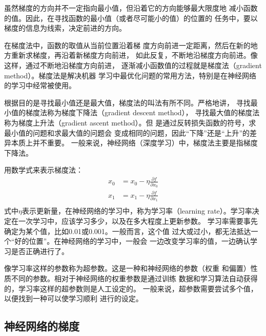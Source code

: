 虽然梯度的方向并不一定指向最小值，但沿着它的方向能够最大限度地
减小函数的值。因此，在寻找函数的最小值（或者尽可能小的值）的位置的
任务中，要以梯度的信息为线索，决定前进的方向。

在梯度法中，函数的取值从当前位置沿着梯
度方向前进一定距离，然后在新的地方重新求梯度，再沿着新梯度方向前进，
如此反复，不断地沿梯度方向前进。像这样，通过不断地沿梯度方向前进，
逐渐减小函数值的过程就是梯度法（gradient method）。梯度法是解决机器
学习中最优化问题的常用方法，特别是在神经网络的学习中经常被使用。

\begin{tcolorbox}
    根据目的是寻找最小值还是最大值，梯度法的叫法有所不同。严格地讲，
    寻找最小值的梯度法称为梯度下降法（gradient descent method），
    寻找最大值的梯度法称为梯度上升法（gradient ascent method）。但
    是通过反转损失函数的符号，求最小值的问题和求最大值的问题会
    变成相同的问题，因此“下降”还是“上升”的差异本质上并不重要。
    一般来说，神经网络（深度学习）中，梯度法主要是指梯度下降法。
\end{tcolorbox}

用数学式来表示梯度法：
\begin{equation}
    \begin{aligned}
        x_0 & =x_0-\eta\frac{\partial f}{\partial x_0} \\
        x_1 & =x_1-\eta\frac{\partial f}{\partial x_1} \\
    \end{aligned}
\end{equation}
式中$\eta$表示更新量，在神经网络的学习中，称为学习率（learning
rate）。学习率决定在一次学习中，应该学习多少，以及在多大程度上更新参数。
学习率需要事先确定为某个值，比如0.01或0.001。一般而言，这个值
过大或过小，都无法抵达一个“好的位置”。在神经网络的学习中，一般会
一边改变学习率的值，一边确认学习是否正确进行了。


\begin{tcolorbox}
    像学习率这样的参数称为超参数。这是一种和神经网络的参数（权重
    和偏置）性质不同的参数。相对于神经网络的权重参数是通过训练
    数据和学习算法自动获得的，学习率这样的超参数则是人工设定的。
    一般来说，超参数需要尝试多个值，以便找到一种可以使学习顺利
    进行的设定。
\end{tcolorbox}

\subsection{神经网络的梯度}

